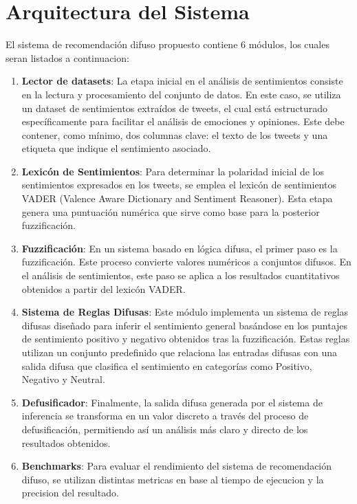 \documentclass[sigconf, review=false, nonacm]{acmart}
\begin{document}
\section{Arquitectura del Sistema}

El sistema de recomendación difuso propuesto contiene 6 módulos, los cuales seran listados a continuacion:
\begin{enumerate}
	\item \textbf{Lector de datasets}: La etapa inicial en el análisis de sentimientos consiste en la lectura
	      y procesamiento del conjunto de datos. En este caso, se utiliza un dataset de sentimientos extraídos
	      de tweets, el cual está estructurado específicamente para facilitar el análisis de emociones y
	      opiniones. Este debe contener, como mínimo, dos columnas clave: el texto de los tweets y una etiqueta
	      que indique el sentimiento asociado.

	\item \textbf{Lexicón de Sentimientos}: Para determinar la polaridad inicial de los sentimientos
	      expresados en los tweets, se emplea el lexicón de sentimientos VADER (Valence Aware Dictionary and
	      Sentiment Reasoner). Esta etapa genera una puntuación numérica que sirve como base para la posterior
	      fuzzificación.

	\item \textbf{Fuzzificación}: En un sistema basado en lógica difusa, el primer paso es la fuzzificación.
	      Este proceso convierte valores numéricos a conjuntos difusos. En el análisis de sentimientos, este
	      paso se aplica a los resultados cuantitativos obtenidos a partir del lexicón VADER.

	\item \textbf{Sistema de Reglas Difusas}: Este módulo implementa un sistema de reglas difusas diseñado
	      para inferir el sentimiento general basándose en los puntajes de sentimiento positivo y negativo
	      obtenidos tras la fuzzificación. Estas reglas utilizan un conjunto predefinido que relaciona las
	      entradas difusas con una salida difusa que clasifica el sentimiento en categorías como Positivo,
	      Negativo y Neutral.

	\item \textbf{Defusificador}: Finalmente, la salida difusa generada por el sistema de inferencia se
	      transforma en un valor discreto a través del proceso de defusificación, permitiendo así un análisis
	      más claro y directo de los resultados obtenidos.

	\item \textbf{Benchmarks}: Para evaluar el rendimiento del sistema de recomendación difuso, se utilizan
	      distintas metricas en base al tiempo de ejecucion y la precision del resultado.
\end{enumerate}
\end{document}
